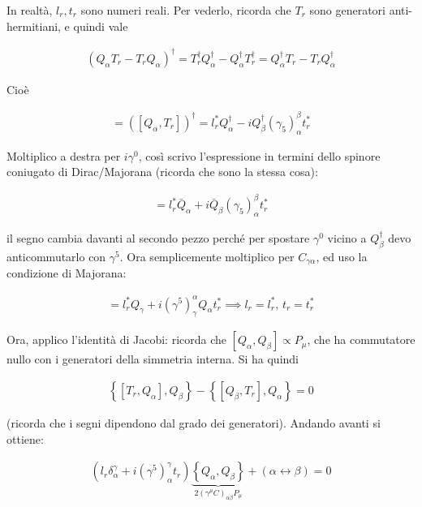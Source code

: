 \documentclass{report}
\begin{document}
In realtà, \(l_r, t_r\) sono numeri reali. Per vederlo, ricorda che \(T_r\) sono generatori anti-hermitiani, e quindi vale 

\begin{align}
    (Q_\alpha T_r - T_r Q_\alpha)^\dagger = T_r^\dagger Q_\alpha^\dagger - Q_\alpha^\dagger T_r^\dagger = Q_\alpha ^\dagger T_r - T_r Q_\alpha^\dagger
\end{align}

Cioè

\begin{align}
    [Q_\alpha^\dagger, T_r] = ([Q_\alpha, T_r])^\dagger = l_r^* Q_\alpha^\dagger -iQ_\beta^\dagger (\gamma_5)^\beta_\alpha t_r^*
\end{align}

Moltiplico a destra per \(i\gamma^0\), così scrivo l'espressione in termini dello spinore coniugato di Dirac/Majorana (ricorda che sono la stessa cosa): 

\begin{align}
    [\bar{Q}_\alpha, T_r] = l_r^* \bar{Q}_\alpha +i\bar{Q}_\beta (\gamma_5)^\beta_\alpha t_r^*
\end{align}

il segno cambia davanti al secondo pezzo perché per spostare \(\gamma^0\) vicino a \(Q_\beta^\dagger\) devo anticommutarlo con \(\gamma^5\). Ora semplicemente moltiplico per \(C_{\gamma\alpha}\), ed uso la condizione di Majorana: 

\begin{align}
    [Q_\gamma, T_r] = l_r^* Q_\gamma + i(\gamma^5)^\alpha_\gamma Q_\alpha t_r^* \implies l_r = l_r^*, \, t_r = t_r^*
\end{align}

Ora, applico l'identità di Jacobi: ricorda che \([Q_\alpha, Q_\beta] \propto P_\mu\), che ha commutatore nullo con i generatori della simmetria interna. Si ha quindi 

\begin{align}
    \left\{[T_r, Q_\alpha], Q_\beta \right\} - \left\{[Q_\beta, T_r],  Q_\alpha\right\} = 0 
\end{align}

(ricorda che i segni dipendono dal grado dei generatori). Andando avanti si ottiene: 

\begin{align}
    (l_r \delta^\gamma_\alpha +i(\gamma^5)^\gamma_\alpha t_r)\underbrace{\left\{Q_\alpha, Q_\beta \right\}}_{2(\gamma^\mu C)_{\alpha\beta}P_\mu} + (\alpha \leftrightarrow \beta) = 0 
\end{align}
\end{document}
